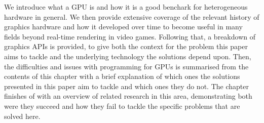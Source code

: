 \documentclass[a4paper,12pt,twoside,openright]{report}
\begin{document}
\label{chp:technical_background}






We introduce what a GPU is and how it is a good benchark for heterogeneous
hardware in general. We then provide extensive coverage of the relevant history
of graphics hardware and how it developed over time to become useful in many
fields beyond real-time rendering in video games. Following that, a breakdown
of graphics APIs is provided, to give both the context for the problem this
paper aims to tackle and the underlying technology the solutions depend upon.
Then, the difficulties and issues with programming for GPUs is summarised from
the contents of this chapter with a brief explanation of which ones the
solutions presented in this paper aim to tackle and which ones they do not. The
chapter finishes of with an overview of related research in this area,
demonstrating both were they succeed and how they fail to tackle the specific
problems that are solved here.
\end{document}
